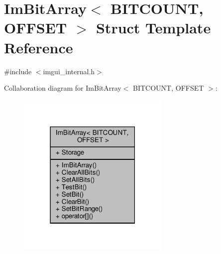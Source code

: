 \hypertarget{structImBitArray}{}\section{Im\+Bit\+Array$<$ B\+I\+T\+C\+O\+U\+NT, O\+F\+F\+S\+ET $>$ Struct Template Reference}
\label{structImBitArray}


{\ttfamily \#include $<$imgui\+\_\+internal.\+h$>$}



Collaboration diagram for Im\+Bit\+Array$<$ B\+I\+T\+C\+O\+U\+NT, O\+F\+F\+S\+ET $>$\+:
\nopagebreak
\begin{figure}[H]
\begin{center}
\leavevmode
\includegraphics[width=207pt]{structImBitArray__coll__graph}
\end{center}
\end{figure}
